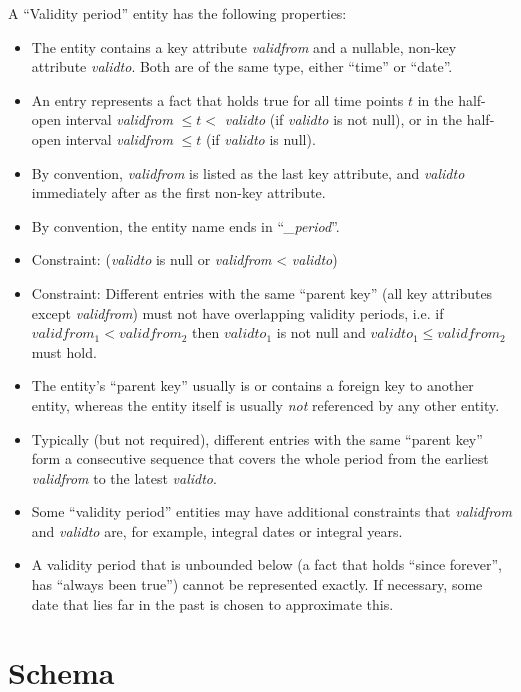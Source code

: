 \documentclass[techdoc]{nobs}   %
\begin{document}
A ``Validity period'' entity has the following properties:
\begin{itemize}
\item The entity contains a key attribute {\it validfrom} and a nullable, non-key attribute {\it validto}.
  Both are of the same type, either ``time'' or ``date''.
\item An entry represents a fact that holds true for all time points $t$ in the half-open interval
 {\it validfrom}  $ \le t < $ {\it validto} (if {\it validto} is not null),
  or in the half-open interval
 {\it validfrom}  $ \le t$ (if {\it validto} is null).
\item By convention, {\it validfrom} is listed as the last key attribute, and {\it validto} immediately after
  as the first non-key attribute.
\item By convention, the entity name ends in ``{\it \_period}''.
\item Constraint: ({\it validto} is null or {\it validfrom} < {\it validto})
\item Constraint: Different entries with the same ``parent key''
  (all key attributes except {\it validfrom})
  must not have overlapping validity periods, i.e.
  if $validfrom_1 < validfrom_2$
  then $validto_1$ is not null and $validto_1 \le validfrom_2$ must hold.
\item The entity's ``parent key'' usually is or contains a foreign key to another entity,
  whereas the entity itself is usually {\it not} referenced by any other entity.
\item Typically (but not required),
  different entries with the same ``parent key'' form a consecutive sequence that
  covers the whole period from the earliest {\it validfrom} to the latest {\it validto}.
\item Some ``validity period'' entities may have additional constraints that {\it validfrom} and {\it validto}
  are, for example, integral dates or integral years.
\item A validity period that is unbounded below (a fact that holds ``since forever'',
  has ``always been true'') cannot be represented exactly.
  If necessary, some date that lies far in the past is chosen to approximate this.
\end{itemize}

\section{Schema}
\label{sec:schemas}
\end{document}
